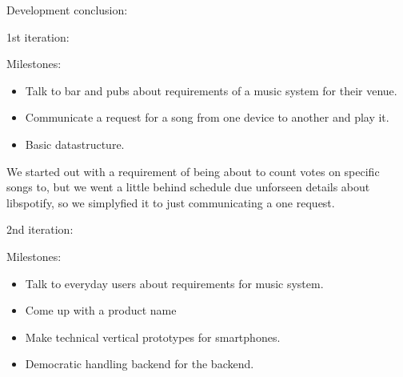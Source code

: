 Development conclusion:

1st iteration:

	Milestones:
	\begin{itemize}
		\item Talk to bar and pubs about requirements of a music system for their venue.
		\item Communicate a request for a song from one device to another and play it.
		\item Basic datastructure.
	\end{itemize}

	We started out with a requirement of being about to count votes on specific songs to, but we went a little behind schedule due unforseen details about libspotify, so we simplyfied it to just communicating a one request.

2nd iteration:
	
	Milestones:
	\begin{itemize}
		\item Talk to everyday users about requirements for music system.
		\item Come up with a product name
		\item Make technical vertical prototypes for smartphones.
		\item Democratic handling backend for the backend.
	\end{itemize}


